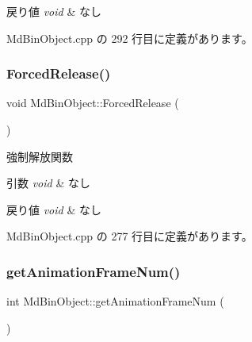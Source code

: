 \begin{DoxyRetVals}{戻り値}
{\em void} & なし \\
\hline
\end{DoxyRetVals}


 Md\+Bin\+Object.\+cpp の 292 行目に定義があります。

\mbox{\label{class_md_bin_object_a4370e12dd75ed61bf5b2251aa23419e2}} 
\subsubsection{\texorpdfstring{Forced\+Release()}{ForcedRelease()}}
{\footnotesize\ttfamily void Md\+Bin\+Object\+::\+Forced\+Release (\begin{DoxyParamCaption}{ }\end{DoxyParamCaption})}



強制解放関数 


\begin{DoxyParams}{引数}
{\em void} & なし \\
\hline
\end{DoxyParams}

\begin{DoxyRetVals}{戻り値}
{\em void} & なし \\
\hline
\end{DoxyRetVals}


 Md\+Bin\+Object.\+cpp の 277 行目に定義があります。

\mbox{\label{class_md_bin_object_a6cd46639b15073908c494c124016157e}} 
\subsubsection{\texorpdfstring{get\+Animation\+Frame\+Num()}{getAnimationFrameNum()}}
{\footnotesize\ttfamily int Md\+Bin\+Object\+::get\+Animation\+Frame\+Num (\begin{DoxyParamCaption}{ }\end{DoxyParamCaption})\hspace{0.3cm}{\ttfamily [inline]}}



